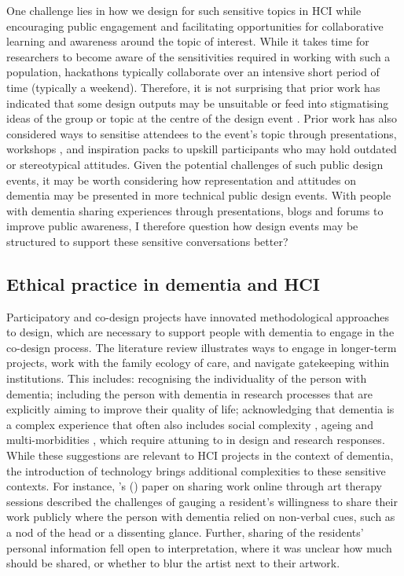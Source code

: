 One challenge lies in how we design for such sensitive topics in HCI while encouraging public engagement and facilitating opportunities for collaborative learning and awareness around the topic of interest. While it takes time for researchers to become aware of the sensitivities required in working with such a population, hackathons typically collaborate over an intensive short period of time (typically a weekend). Therefore, it is not surprising that prior work has indicated that some design outputs may be unsuitable or feed into stigmatising ideas of the group or topic at the centre of the design event \citep{toros_co-creation_2020}. Prior work has also considered ways to sensitise attendees to the event's topic through presentations, workshops \citep{hope_hackathons_2019}, and inspiration packs \citep{birbeck_self_2017} to upskill participants who may hold outdated or stereotypical attitudes. Given the potential challenges of such public design events, it may be worth considering how representation and attitudes on dementia may be presented in more technical public design events. With people with dementia sharing experiences through presentations, blogs and forums to improve public awareness, I therefore question how design events may be structured to support these sensitive conversations better?

\subsection{Ethical practice in dementia and HCI}
\label{BL:gap:Ethics}
Participatory and co-design projects have innovated methodological approaches to design, which are necessary to support people with dementia to engage in the co-design process. The literature review illustrates ways to engage in longer-term projects, work with the family ecology of care, and navigate gatekeeping within institutions. This includes: recognising the individuality of the person with dementia; including the person with dementia in research processes that are explicitly aiming to improve their quality of life; acknowledging that dementia is a complex experience that often also includes social complexity \citep{keyes2019living}, ageing and multi-morbidities \citep{buse_materialising_2016}, which require attuning to in design and research responses. While these suggestions are relevant to HCI projects in the context of dementia, the introduction of technology brings additional complexities to these sensitive contexts. For instance, \citeauthor{cornejo_vulnerability_2016}'s (\citeyear{cornejo_vulnerability_2016}) paper on sharing work online through art therapy sessions described the challenges of gauging a resident's willingness to share their work publicly where the person with dementia relied on non-verbal cues, such as a nod of the head or a dissenting glance. Further, sharing of the residents' personal information fell open to interpretation, where it was unclear how much should be shared, or whether to blur the artist next to their artwork. 

